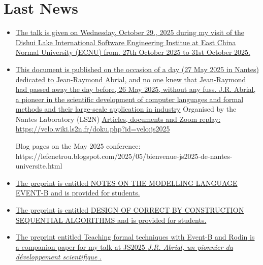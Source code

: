 \documentclass[ 12pt]{article}
\begin{document}
\section{Last News}
\label{sec:last-news}



\begin{itemize}



  \item[]
  \href{https://mery54.github.io/mery/talks/talk-shanghai.pdf}{The
    talk  is given on Wednesday, October 29., 2025  during my visit of the Dishui Lake International Software
  Engineering Institue   at
East China Normal University (ECNU) from. 27th October 2025 to 31st October 2025. }

\item[]
  \href{https://mery54.github.io/mery/publications/final-nantes27052025.pdf}{This
document is published on the occasion of a day (27 May 2025 in
Nantes) dedicated to
Jean-Raymond Abrial, and no one knew that Jean-Raymond had
passed away the day before, 26 May 2025, without any
fuss. J.R. Abrial, a pioneer in the scientific development of computer
languages and formal methods and their large-scale application in
industry}
Organised by the Nantes  Laboratory (LS2N)
\href{https://velo.wiki.ls2n.fr/doku.php?id=velo:js2025}{Articles,
  documents and Zoom replay:   https://velo.wiki.ls2n.fr/doku.php?id=velo:js2025}

Blog pages on the May 2025 conference:
https://lefenetrou.blogspot.com/2025/05/bienvenue-js2025-de-nantes-universite.html


  \item[]
  \href{https://mery54.github.io/mery/publications/preprint-chaptereventb.pdf}{The
    preprint is  entitled \textsf{NOTES ON THE MODELLING LANGUAGE EVENT-B}  and is provided for students.}


  
\item[]
  \href{https://mery54.github.io/mery/publications/preprint-chapterseqalgo.pdf}{The
    preprint is  entitled \textsf{DESIGN OF CORRECT BY CONSTRUCTION
      SEQUENTIAL ALGORITHMS}  and is provided for students.}


  
\item[]
  \href{https://mery54.github.io/mery/publications/final-nantes27052025.pdf}{
    The preprint entitled \textsf{Teaching formal techniques  with Event-B  and 
  Rodin} is  a companion paper for my talk at JS2025 \textit{J.R. Abrial, un pionnier du développement scientifique }.}
    
\end{itemize}
\end{document}
